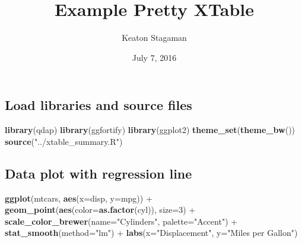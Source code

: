 \documentclass[]{article}
\title{Example Pretty XTable}
\author{Keaton Stagaman}
\date{July 7, 2016}
\newenvironment{Shaded}{\begin{snugshade}}{\end{snugshade}}
\newcommand{\KeywordTok}[1]{\textcolor[rgb]{0.13,0.29,0.53}{\textbf{{#1}}}}
\newcommand{\DataTypeTok}[1]{\textcolor[rgb]{0.13,0.29,0.53}{{#1}}}
\newcommand{\DecValTok}[1]{\textcolor[rgb]{0.00,0.00,0.81}{{#1}}}
\newcommand{\StringTok}[1]{\textcolor[rgb]{0.31,0.60,0.02}{{#1}}}
\newcommand{\NormalTok}[1]{{#1}}
\begin{document}
\maketitle

\subsection{Load libraries and source
files}\label{load-libraries-and-source-files}

\begin{Shaded}
\begin{Highlighting}[]
\KeywordTok{library}\NormalTok{(qdap)}
\KeywordTok{library}\NormalTok{(ggfortify)}
\KeywordTok{library}\NormalTok{(ggplot2)}
\KeywordTok{theme_set}\NormalTok{(}\KeywordTok{theme_bw}\NormalTok{())}
\KeywordTok{source}\NormalTok{(}\StringTok{"../xtable_summary.R"}\NormalTok{)}
\end{Highlighting}
\end{Shaded}

\subsection{Data plot with regression
line}\label{data-plot-with-regression-line}

\begin{Shaded}
\begin{Highlighting}[]
\KeywordTok{ggplot}\NormalTok{(mtcars, }\KeywordTok{aes}\NormalTok{(}\DataTypeTok{x=}\NormalTok{disp, }\DataTypeTok{y=}\NormalTok{mpg)) +}\StringTok{ }
\StringTok{    }\KeywordTok{geom_point}\NormalTok{(}\KeywordTok{aes}\NormalTok{(}\DataTypeTok{color=}\KeywordTok{as.factor}\NormalTok{(cyl)), }\DataTypeTok{size=}\DecValTok{3}\NormalTok{) +}\StringTok{ }
\StringTok{    }\KeywordTok{scale_color_brewer}\NormalTok{(}\DataTypeTok{name=}\StringTok{"Cylinders"}\NormalTok{, }\DataTypeTok{palette=}\StringTok{"Accent"}\NormalTok{) +}\StringTok{ }
\StringTok{    }\KeywordTok{stat_smooth}\NormalTok{(}\DataTypeTok{method=}\StringTok{"lm"}\NormalTok{) +}\StringTok{ }
\StringTok{    }\KeywordTok{labs}\NormalTok{(}\DataTypeTok{x=}\StringTok{"Displacement"}\NormalTok{, }\DataTypeTok{y=}\StringTok{"Miles per Gallon"}\NormalTok{)}
\end{Highlighting}
\end{Shaded}
\end{document}
